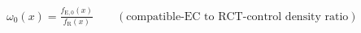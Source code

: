 \documentclass[border=8pt]{standalone}
\begin{document}
$\displaystyle \omega_0(x)=\frac{f_{\mathrm{E},0}(x)}{f_{\mathrm{R}}(x)}\qquad(\text{compatible-EC to RCT-control density ratio})$
\end{document}
